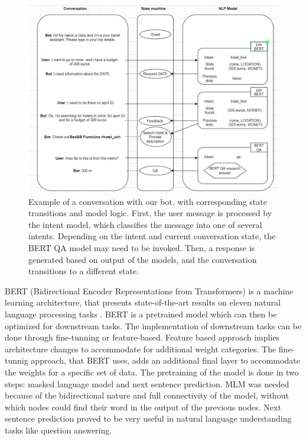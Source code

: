 \documentclass[runningheads,a4paper,11pt]{report}
\begin{document}
\begin{figure}
\centerline{\includegraphics[width=\textwidth]{Img/stateM.JPG}}  
	\caption {Example of a conversation with our bot, with corresponding state transitions and model logic. First, the user message is processed by the intent model,
which classifies the message into one of several intents. Depending on the intent and current conversation state, the BERT QA model may need to be invoked. Then, a response is generated based on output of the models, and the conversation transitions to a different state.
}
	\label{stateM}
\end{figure}

BERT (Bidirectional Encoder Representations from Transformers) is a machine learning architecture, that presents state-of-the-art results on eleven natural language processing tasks \cite{bert}. BERT is a pretrained model which can then be optimized for downstream tasks. The implementation of downstream tasks can be done through fine-tunning or feature-based. Feature based approach implies architecture changes to accommodate for additional weight categories. The fine-tunnig approach, that BERT uses, adds an additional final layer to accommodate the weights for a specific set of data. The pretraining of the model is done in two steps: masked language model and next sentence prediction. MLM was needed because of the bidirectional nature and full connectivity of the model, without which nodes could find their word in the output of the previous nodes. Next sentence prediction proved to be very useful in natural language understanding tasks like question answering.
\end{document}
